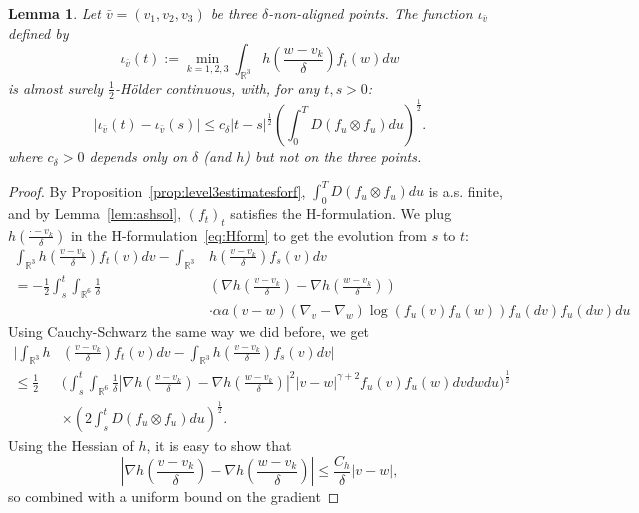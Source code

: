 \documentclass[11pt,a4paper]{article}
\theoremstyle{definition}
\theoremstyle{plain}
\newtheorem{lemma}[defi]{Lemma}
\begin{document}
\begin{lemma}
    \label{lem:Höldercontof3aligned}
    Let $\bar{v}=(v_1,v_2,v_3)$ be three $\delta$-non-aligned points. The function $\iota_{\bar{v}}$ defined by
    \begin{equation}
    \label{eq:defiota}
        \iota_{\bar{v}}(t):=\min_{k=1,2,3} \int_{\mathbb{R}^3}h\left(\frac{w-v_k}{\delta}\right)f_t(w)dw
    \end{equation}
    is almost surely $\frac{1}{2}$-Hölder continuous,
    with, for any $t,s>0$:
    $$\vert \iota_{\bar{v}}(t) - \iota_{\bar{v}}(s)\vert \leq c_\delta \vert t-s\vert^\frac{1}{2} \left( \int_0^T D(f_u\otimes f_u)du\right)^\frac{1}{2}.$$
    where $c_\delta>0$ depends only on $\delta$ (and $h$) but not on the three points.
\end{lemma}
\begin{proof}
    By Proposition~\ref{prop:level3estimatesforf}, $\int_0^T D(f_u\otimes f_u)du$ is a.s. finite, and by Lemma~\ref{lem:ashsol}, $(f_t)_t$ satisfies the H-formulation. We plug $h(\frac{\cdot-v_k}{\delta})$ in the H-formulation~\eqref{eq:Hform} to get the evolution from $s$ to $t$:
    \begin{align*}
     \int_{\mathbb{R}^3} h\left(\frac{v-v_k}{\delta}\right) f_t(v)dv-\int_{\mathbb{R}^3} &h\left(\frac{v-v_k}{\delta}\right) f_s(v) dv\\
     = -\frac{1}{2}
     \int_s^t \int_{\mathbb{R}^6}  \frac{1}{\delta}&\left(\nabla h\left(\frac{v-v_k}{\delta}\right) - \nabla h\left(\frac{w-v_k}{\delta}\right)\right)\\
     &\cdot \alpha a(v-w) (\nabla_v - \nabla_w)\log(f_u(v)f_u(w)) f_u(dv) f_u(dw)du
    \end{align*}
    Using Cauchy-Schwarz the same way we did before, we get
    \begin{align*}
     \bigg\vert\int_{\mathbb{R}^3} h&\left(\frac{v-v_k}{\delta}\right) f_t(v)dv-\int_{\mathbb{R}^3} h\left(\frac{v-v_k}{\delta}\right) f_s(v) dv \bigg\vert\\
     \leq \frac{1}{2}&\bigg(
     \int_s^t \int_{\mathbb{R}^6}  \frac{1}{\delta}\left\vert\nabla h\left(\frac{v-v_k}{\delta}\right) - \nabla h\left(\frac{w-v_k}{\delta}\right)\right\vert^2\vert v-w\vert ^{\gamma+2} f_u(v) f_u(w)dvdwdu \bigg)^\frac{1}{2}\\
     &\times\left(2\int_s^t D(f_u \otimes f_u)du\right)^\frac{1}{2}.
    \end{align*}
    Using the Hessian of $h$, it is easy to show that
    $$\left\vert\nabla h\left(\frac{v-v_k}{\delta}\right)- \nabla h\left(\frac{w-v_k}{\delta}\right)\right\vert \leq \frac{C_h}{\delta}\vert v-w\vert,$$ so combined with a uniform bound on the gradient

\end{proof}
\end{document}
